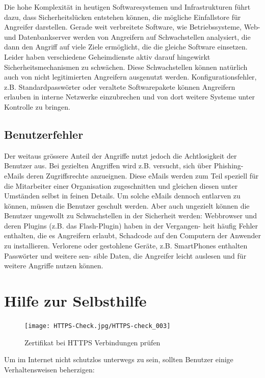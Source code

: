 \documentclass[10pt,foldmark,tumble]{leaflet}
\begin{document}
Die hohe Komplexität in heutigen Softwaresystemen und Infrastrukturen führt dazu, dass
Sicherheitslücken entstehen können, die mögliche Einfallstore für Angreifer darstellen. 
Gerade weit verbreitete Software, wie Betriebssysteme, Web- und Datenbankserver werden 
von Angreifern auf Schwachstellen analysiert, die dann den Angriff auf viele Ziele 
ermöglicht, die die gleiche Software einsetzen. Leider haben verschiedene Geheimdienste 
aktiv darauf hingewirkt Sicherheitsmechanismen zu schwächen. Diese Schwachstellen können 
natürlich auch von nicht legitimierten Angreifern ausgenutzt werden.
Konfigurationsfehler, z.B. Standardpasswörter oder veraltete Softwarepakete können 
Angreifern erlauben in interne Netzwerke einzubrechen und von dort weitere Systeme unter
Kontrolle zu bringen.

\subsection{Benutzerfehler}

Der weitaus grössere Anteil der Angriffe nutzt jedoch die Achtlosigkeit der Benutzer aus. 
Bei gezielten Angriffen wird z.B. versucht, sich über Phishing-eMails deren Zugriffsrechte 
anzueignen. Diese eMails werden zum Teil speziell für die Mitarbeiter einer Organisation 
zugeschnitten und gleichen diesen unter Umständen selbst in feinen Details. Um solche eMails 
dennoch entlarven zu können, müssen die Benutzer geschult werden.
Aber auch ungezielt können die Benutzer ungewollt zu Schwachstellen in der Sicherheit
werden: Webbrowser und deren Plugins (z.B. das Flash-Plugin) haben in der Vergangen-
heit häufig Fehler enthalten, die es Angreifern erlaubt, Schadcode auf den Computern der
Anwender zu installieren.
Verlorene oder gestohlene Geräte, z.B. SmartPhones enthalten Passwörter und weitere sen-
sible Daten, die Angreifer leicht auslesen und für weitere Angriffe nutzen können.

\section{Hilfe zur Selbsthilfe}

\begin{figure}
\centering
\texttt{[image: HTTPS-Check.jpg/HTTPS-check\_003]}
\caption{Zertifikat bei HTTPS Verbindungen prüfen}
\label{sslcert}
\end{figure}

Um im Internet nicht schutzlos unterwegs zu sein, sollten Benutzer einige Verhaltensweisen
beherzigen:
\end{document}
